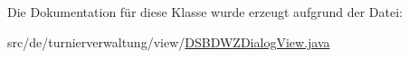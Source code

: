 Die Dokumentation für diese Klasse wurde erzeugt aufgrund der Datei\+:\begin{DoxyCompactItemize}
\item 
src/de/turnierverwaltung/view/\hyperlink{_d_s_b_d_w_z_dialog_view_8java}{D\+S\+B\+D\+W\+Z\+Dialog\+View.\+java}\end{DoxyCompactItemize}
